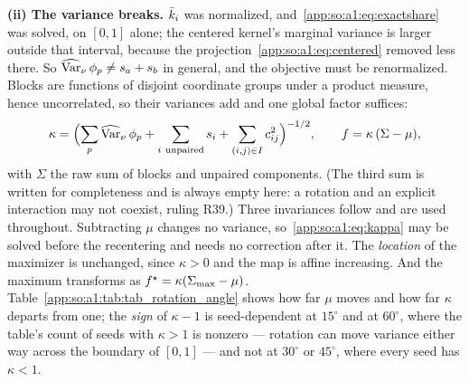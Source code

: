 \textbf{(ii) The variance breaks.} $\bar k_i$ was normalized,
and~\eqref{app:so:a1:eq:exactshare} was solved, on $[0,1]$ alone; the centered
kernel's marginal variance is larger outside that interval, because the
projection~\eqref{app:so:a1:eq:centered} removed less there. So
$\operatorname{\widehat{\mathrm{Var}}}_\nu\phi_p\neq s_a+s_b$ in general, and the objective must be renormalized.
Blocks are functions of disjoint coordinate groups under a product measure,
hence uncorrelated, so their variances add and one global factor suffices:
\begin{equation}\label{app:so:a1:eq:kappa}
  \kappa={\Bigl(\sum_p\operatorname{\widehat{\mathrm{Var}}}_\nu\phi_p
               +\sum_{i\ \mathrm{unpaired}}s_i
               +\sum_{(i,j)\in I}c_{ij}^2\Bigr)}^{-1/2},
  \qquad
  f=\kappa\,(\Sigma-\mu),
\end{equation}
with $\Sigma$ the raw sum of blocks and unpaired components. (The third sum is
written for completeness and is always empty here: a rotation and an explicit
interaction may not coexist, ruling R39.) Three invariances follow and are
used throughout. Subtracting $\mu$ changes no variance,
so~\eqref{app:so:a1:eq:kappa} may be solved before the recentering and needs
no correction after it. The \emph{location} of the maximizer is unchanged,
since $\kappa>0$ and the map is affine increasing. And the maximum transforms
as $f^\star=\kappa(\Sigma_{\max}-\mu)$.
Table~\ref{app:so:a1:tab:tab_rotation_angle} shows how far $\mu$ moves and how
far $\kappa$ departs from one; the \emph{sign} of $\kappa-1$ is seed-dependent
at $15^\circ$ and at $60^\circ$, where the table's count of seeds with
$\kappa>1$ is nonzero --- rotation can move variance either way across the
boundary of $[0,1]$ --- and not at $30^\circ$ or $45^\circ$, where every seed
has $\kappa<1$.

